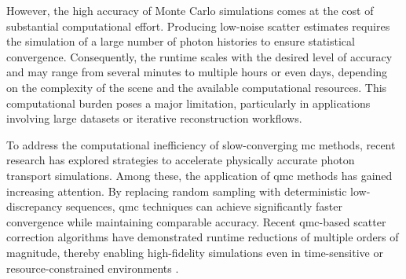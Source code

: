 However, the high accuracy of Monte Carlo simulations comes at the cost of
substantial computational effort. Producing low-noise scatter estimates requires
the simulation of a large number of photon histories to ensure statistical
convergence. Consequently, the runtime scales with the desired level of
accuracy and may range from several minutes to multiple hours or even days,
depending on the complexity of the scene and the available computational
resources. This computational burden poses a major limitation, particularly in
applications involving large datasets or iterative reconstruction workflows.

To address the computational inefficiency of slow-converging \ac{mc}
methods, recent research has explored strategies to accelerate physically
accurate photon transport simulations. Among these, the application of
\ac{qmc} methods has gained increasing attention. By replacing random sampling
with deterministic low-discrepancy sequences, \ac{qmc} techniques can achieve
significantly faster convergence while maintaining comparable accuracy.
Recent \ac{qmc}-based scatter correction algorithms have demonstrated runtime
reductions of multiple orders of magnitude, thereby enabling high-fidelity
simulations even in time-sensitive or resource-constrained environments
\cite{qmcXray2023,lin2025scatter, doignies2024echantillonnage}.
